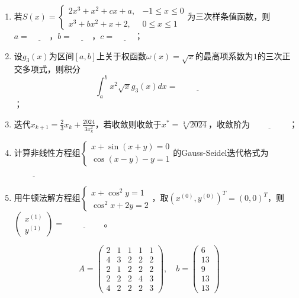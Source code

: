 \documentclass[12pt,a4paper]{article}
\begin{document}
\begin{enumerate}
    \item 若$S(x) = \begin{cases}
        2x^3 + x^2 + cx + a, & -1 \leq x \leq 0 \\
        x^3 + bx^2 + x + 2, & 0 \leq x \leq 1
    \end{cases}$为三次样条值函数，则\\
    $a = \underline{\hspace{1cm}}$，$b = \underline{\hspace{1cm}}$，$c = \underline{\hspace{1cm}}$；

    \item 设$g_3(x)$为区间$[a,b]$上关于权函数$\omega(x) = \sqrt{x}$的最高项系数为$1$的三次正交多项式，则积分$$\int_a^b x^2\sqrt{x}g_3(x)dx = \underline{\hspace{2cm}}$$；
    
    \item 迭代$x_{k+1} = \frac{2}{3}x_k + \frac{2024}{3x_k^2}$，若收敛则收敛于$x^* = \sqrt[3]{2024}$，收敛阶为$\underline{\hspace{2cm}}$；
    
    \item 计算非线性方程组$\begin{cases}
        x + \sin(x + y) = 0 \\
        \cos(x - y) - y = 1
    \end{cases}$的Gauss-Seidel迭代格式为$\underline{\hspace{2cm}}$
    
    \item 用牛顿法解方程组$\begin{cases}
        x + \cos^2 y = 1 \\
        \cos^2 x + 2y = 2
    \end{cases}$，取$(x^{(0)}, y^{(0)})^T = (0, 0)^T$，则$\begin{pmatrix}
        x^{(1)} \\
        y^{(1)}
    \end{pmatrix} = \underline{\hspace{2cm}}$。
\end{enumerate}

\newpage
{}
$$
A = \begin{pmatrix}
    2 & 1 & 1 & 1 & 1 \\
    4 & 3 & 2 & 2 & 2 \\
    2 & 1 & 2 & 2 & 2 \\
    2 & 2 & 2 & 4 & 3 \\
    4 & 2 & 2 & 2 & 3
\end{pmatrix}, \quad
b = \begin{pmatrix}
    6 \\
    13 \\
    9 \\
    13 \\
    13
\end{pmatrix}
$$
\end{document}
